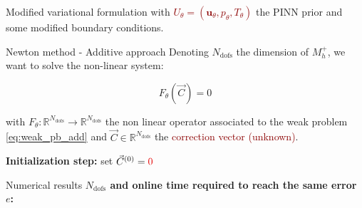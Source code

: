 \begin{frame}{Modified variational formulation}
    \vspace{5pt}
    with \textcolor{darkred}{$U_\theta = (\bm{u}_\theta, p_\theta, T_\theta)$} the PINN prior and some modified boundary conditions.
\end{frame}

\begin{frame}{Newton method - Additive approach}
    \vspace{-5pt}
    Denoting $N_\text{dofs}$ the dimension of $M_h^+$, we want to solve the non-linear system: %

    \normalsize
    \vspace{-10pt}
    \begin{equation*}
        F_\theta(\vec{C}) = 0 
    \end{equation*}

    \vspace{-2pt}
    with $F_\theta:\mathbb{R}^{N_\text{dofs}} \to \mathbb{R}^{N_\text{dofs}}$ the non linear operator associated to the weak problem \eqref{eq:weak_pb_add} and $\vec{C}\in \mathbb{R}^{N_\text{dofs}}$ the \textcolor{darkred}{correction vector (unknown)}.

	\setcounter{algocf}{1}
    \begin{center}
        \small
        \begin{minipage}{0.9\linewidth}
            \begin{algorithm}[H]
                \SetAlgoLined
                \caption{Newton algorithm}
                \textbf{Initialization step:} set $\vec{C}^{(0)} = \textcolor{darkred}{0}$\;
            \end{algorithm}
        \end{minipage}
    \end{center}
\end{frame}

\begin{frame}{Numerical results}
    \textbf{$N_\text{dofs}$ and online time required to reach the same error $e$:}
    \vspace{-5pt}

    \begin{figure}[H]
        \centering
    \end{figure}

    \begin{table}
    \end{table}
\end{frame}
